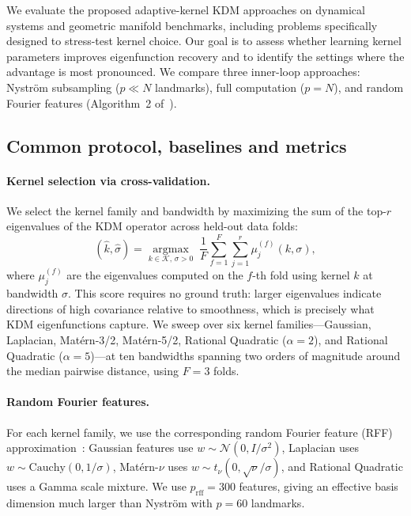 \documentclass[11pt]{article}
\theoremstyle{remark}
\begin{document}
We evaluate the proposed adaptive-kernel KDM approaches on dynamical systems and geometric manifold benchmarks, including problems specifically designed to stress-test kernel choice. Our goal is to assess whether learning kernel parameters improves eigenfunction recovery and to identify the settings where the advantage is most pronounced.
We compare three inner-loop approaches: Nystr\"om subsampling ($p\ll N$ landmarks), full computation ($p=N$), and random Fourier features (Algorithm~2 of~\citet{pmlr-v195-pillaud-vivien23a}).

\subsection{Common protocol, baselines and metrics}
\label{subsec:exp-protocol}

\paragraph{Kernel selection via cross-validation.}
We select the kernel family and bandwidth by maximizing the sum of the top-$r$ eigenvalues of the KDM operator across held-out data folds:
\[
(\hat k, \hat\sigma) = \operatorname*{argmax}_{k\in\mathcal{K},\,\sigma>0} \;\frac{1}{F}\sum_{f=1}^F \sum_{j=1}^r \mu_j^{(f)}(k,\sigma),
\]
where $\mu_j^{(f)}$ are the eigenvalues computed on the $f$-th fold using kernel $k$ at bandwidth $\sigma$.
This score requires no ground truth: larger eigenvalues indicate directions of high covariance relative to smoothness, which is precisely what KDM eigenfunctions capture.
We sweep over six kernel families---Gaussian, Laplacian, Mat\'ern-3/2, Mat\'ern-5/2, Rational Quadratic ($\alpha=2$), and Rational Quadratic ($\alpha=5$)---at ten bandwidths spanning two orders of magnitude around the median pairwise distance, using $F=3$ folds.

\paragraph{Random Fourier features.}
For each kernel family, we use the corresponding random Fourier feature (RFF) approximation~\citep{RR08}: Gaussian features use $w\sim\mathcal{N}(0,I/\sigma^2)$, Laplacian uses $w\sim\mathrm{Cauchy}(0,1/\sigma)$, Mat\'ern-$\nu$ uses $w\sim t_{\nu}(0,\sqrt{\nu}/\sigma)$, and Rational Quadratic uses a Gamma scale mixture.
We use $p_{\mathrm{rff}}=300$ features, giving an effective basis dimension much larger than Nystr\"om with $p=60$ landmarks.
\end{document}
